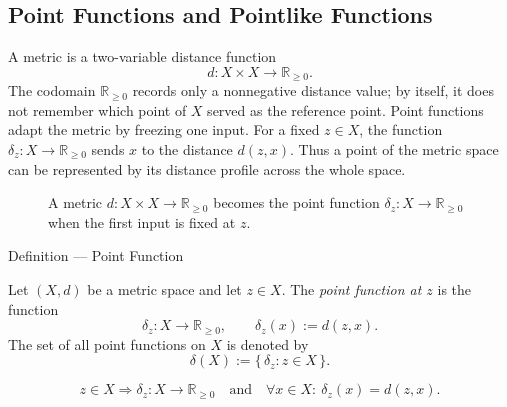 \subsection{Point Functions and Pointlike Functions}

\begin{remark*}[Exposition]
A metric is a two-variable distance function
\[
  d:X\times X\to\mathbb{R}_{\geq 0}.
\]
The codomain \(\mathbb{R}_{\geq 0}\) records only a nonnegative distance
value; by itself, it does not remember which point of \(X\) served as the
reference point.  Point functions adapt the metric by freezing one input.
For a fixed \(z\in X\), the function \(\delta_z:X\to\mathbb{R}_{\geq 0}\)
sends \(x\) to the distance \(d(z,x)\).  Thus a point of the metric space can
be represented by its distance profile across the whole space.
\end{remark*}

\begin{figure}[htbp]
\centering

\caption{A metric \(d:X\times X\to\mathbb{R}_{\geq 0}\) becomes the point
function \(\delta_z:X\to\mathbb{R}_{\geq 0}\) when the first input is fixed at
\(z\).}
\label{fig:point-function-freezes-metric}
\end{figure}

\begin{definitionbox}{Definition --- Point Function}
\begin{definition}\label{def:metric-point-function}
Let \((X,d)\) be a metric space and let \(z\in X\).  The
\emph{point function at \(z\)} is the function
\[
  \delta_z:X\to\mathbb{R}_{\geq 0},
  \qquad
  \delta_z(x):=d(z,x).
\]
The set of all point functions on \(X\) is denoted by
\[
  \delta(X):=\{\,\delta_z:z\in X\,\}.
\]
\end{definition}
\end{definitionbox}


\begin{remark*}
\[
z\in X
\Longrightarrow
\delta_z:X\to\mathbb{R}_{\geq 0}
\quad\text{and}\quad
\forall x\in X{:}\ \delta_z(x)=d(z,x).
\]
\end{remark*}

